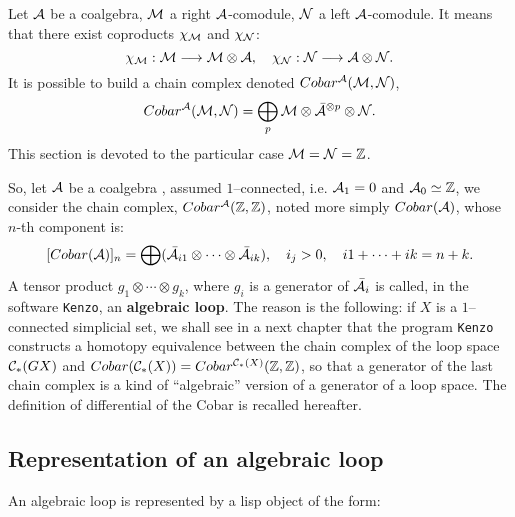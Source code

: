 Let ${\cal A}$ be a coalgebra, ${\cal M}$ a  right ${\cal A}$-comodule, ${\cal N}$ a left ${\cal A}$-comodule.
It means that there exist coproducts $\chi_{\cal M}$ and $\chi_{\cal N}$:
$$\chi_{\cal M}: {\cal M} \longrightarrow {\cal M}\otimes {\cal A},\quad
  \chi_{\cal N}: {\cal N} \longrightarrow {\cal A}\otimes {\cal N}.  $$
It is possible to build a chain complex denoted $Cobar^{\cal A}({\cal M}, {\cal N})$,
$$Cobar^{\cal A}({\cal M}, {\cal N}) = \bigoplus_p
{\cal M}\otimes {\bar{\cal A}}^{\otimes p} \otimes {\cal N}.$$
This section  is devoted to the particular case ${\cal M}={\cal N}=\mathbb{Z}$.
\par
So, let ${\cal A}$ be  a coalgebra , assumed $1$--connected,
i.e. ${\cal A}_1 = 0$ and  ${\cal A}_0 \simeq \mathbb{Z}$,
we consider the chain complex, $Cobar^{{\cal A}}(\mathbb{Z}, \mathbb{Z})$, noted more simply  $Cobar({\cal A})$,
whose $n$-th component is:
$$ [Cobar({\cal A})]_n = \bigoplus ({\bar{\cal A}}_{i1} \otimes \cdots \otimes {\bar{\cal A}}_{ik}),\quad i_j >0, \quad
i1 + \cdots + ik= n+k.$$
A tensor product $g_1 \otimes \cdots \otimes g_k$, where
$g_i$ is a generator of ${\bar{\cal A}}_{i}$ is called, in the software {\tt Kenzo},
an {\bf algebraic loop}.
The reason is the following: if $X$ is a $1$--connected simplicial set, we shall see in a next
chapter that the program {\tt Kenzo} constructs
a homotopy equivalence between the chain complex of the loop space ${\cal C}_*(GX)$
and $Cobar({\cal C}_*(X)) = Cobar^{{\cal C}_*(X)}(\mathbb{Z}, \mathbb{Z})$,
so that a generator of the last chain complex is a kind of ``algebraic'' version of a generator of a loop space.
The definition of  differential of the Cobar is recalled hereafter.


\subsection {Representation of an algebraic loop}

An algebraic loop is represented by a lisp object of the form:

